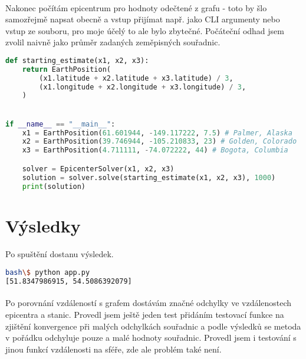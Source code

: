\documentclass{article}
\begin{document}
    \paragraph{} Nakonec počítám epicentrum pro hodnoty odečtené z grafu - toto by šlo samozřejmě
        napsat obecně a vstup přijímat např. jako CLI argumenty nebo vstup ze souboru, pro 
        moje účelý to ale bylo zbytečné. Počáteční odhad jsem zvolil naivně jako průměr zadaných
        zeměpisných souřadnic.

    \begin{lstlisting}[language=Python]
def starting_estimate(x1, x2, x3):
    return EarthPosition(
        (x1.latitude + x2.latitude + x3.latitude) / 3,
        (x1.longitude + x2.longitude + x3.longitude) / 3,
    )


if __name__ == "__main__":
    x1 = EarthPosition(61.601944, -149.117222, 7.5) # Palmer, Alaska
    x2 = EarthPosition(39.746944, -105.210833, 23) # Golden, Colorado
    x3 = EarthPosition(4.711111, -74.072222, 44) # Bogota, Columbia

    solver = EpicenterSolver(x1, x2, x3)
    solution = solver.solve(starting_estimate(x1, x2, x3), 1000)
    print(solution)\end{lstlisting}

    \section{Výsledky}
    \paragraph{} Po spuštění dostanu výsledek.

    \begin{lstlisting}[language=Bash]
bash\$ python app.py
[51.8347986915, 54.5086392079]\end{lstlisting}

    \paragraph{} Po porovnání vzdáleností s grafem dostávám značné odchylky ve vzdálenostech
    epicentra a stanic. Provedl jsem ještě jeden test přidáním testovací funkce
    na zjištění konvergence při malých odchylkách souřadnic a podle výsledků se metoda v 
    pořádku odchyluje pouze a malé hodnoty souřadnic. Provedl jsem i testování s jinou
    funkcí vzdálenosti na sféře, zde ale problém také není.
\end{document}
